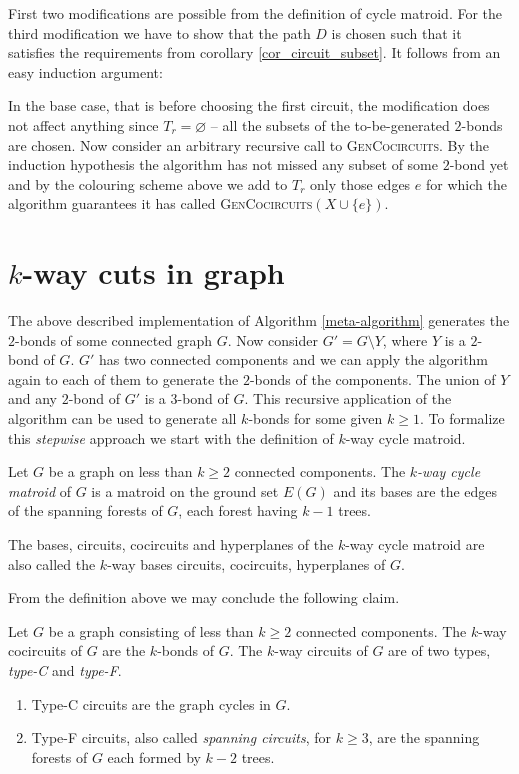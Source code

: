 First two modifications are possible from the definition of cycle matroid. For the third modification we have to show that the path $D$ is chosen such that it satisfies the requirements from corollary \ref{cor_circuit_subset}. It follows from an easy induction argument:

In the base case, that is before choosing the first circuit, the modification does not affect anything since $T_r = \varnothing$ -- all the subsets of the to-be-generated $2$-bonds are chosen. Now consider an arbitrary recursive call to \textsc{GenCocircuits}. By the induction hypothesis the algorithm has not missed any subset of some $2$-bond yet and by the colouring scheme above we add to $T_r$ only those edges $e$ for which the algorithm guarantees it has called \textsc{GenCocircuits}$(X \cup \{e\})$.

\section{$k$-way cuts in graph}

The above described implementation of Algorithm \ref{meta-algorithm} generates the $2$-bonds of some connected graph $G$. Now consider $G' = G \setminus Y$, where $Y$ is a $2$-bond of $G$. $G'$ has two connected components and we can apply the algorithm again to each of them to generate the $2$-bonds of the components. The union of $Y$ and any $2$-bond of $G'$ is a $3$-bond of $G$. This recursive application of the algorithm can be used to generate all $k$-bonds for some given $k \geq 1$. To formalize this \textit{stepwise} approach we start with the definition of $k$-way cycle matroid.

\begin{defn}
	\label{kway_cycle_matroid}
	Let $G$ be a graph on less than $k \geq 2$ connected components. The \textit{$k$-way cycle matroid} of $G$ is a matroid on the ground set $E(G)$ and its bases are the edges of the spanning forests of $G$, each forest having $k-1$ trees.

	The bases, circuits, cocircuits and hyperplanes of the $k$-way cycle matroid are also called the $k$-way bases circuits, cocircuits, hyperplanes of $G$.
\end{defn}

From the definition above we may conclude the following claim.

\begin{claim}
	\label{circuit_types}
	Let $G$ be a graph consisting of less than $k \geq 2$ connected components.
	The $k$-way cocircuits of $G$ are the $k$-bonds of $G$. The $k$-way circuits of $G$ are of two types, \textit{type-C} and \textit{type-F}.

	\begin{enumerate}
		\item Type-C circuits are the graph cycles in $G$.
		\item Type-F circuits, also called \textit{spanning circuits}, for $k \geq 3$, are the spanning forests of $G$ each formed by $k-2$ trees.
	\end{enumerate}
\end{claim}

